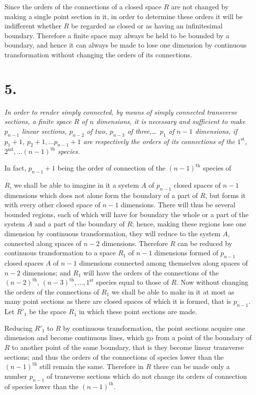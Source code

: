 \documentclass{article}
\begin{document}
Since the orders of the connections of a closed space $R$ are not changed by making a single point section in it, in order to determine these orders it will be indifferent whether $R$ be regarded as closed or as having an infinitesimal boundary. Therefore a finite space may always be held to be bounded by a boundary, and hence it can always be made to lose one dimension by continuous transformation without changing the orders of its connections.

\section*{5.}

\emph{In order to render simply connected, by means of simply connected transverse sections, a finite space $R$ of $n$ dimensions, it is necessary and sufficient to make $p_{n-1}$ linear sections, $p_{n-2}$ of two, $p_{n-3}$ of three,\ldots\ $p_{1}$ of $n-1$ dimensions, if $p_{1}+1$, $p_{2}+1,\ldots p_{n-1}+1$ are respectively the orders of its connections of the $1^{\text{st}}$, $2^{\text{nd}},\ldots (n-1)^{\text{th}}$ species.}

In fact, $p_{n-1}+1$ being the order of connection of the $(n-1)^{\text{th}}$ species of

$R$, we shall be able to imagine in it a system $A$ of $p_{n-1}$ closed spaces of $n-1$ dimensions which does not alone form the boundary of a part of $R$, but forms it with every other closed space of $n-1$ dimensions. There will thus be several bounded regions, each of which will have for boundary the whole or a part of the system $A$ and a part of the boundary of $R$; hence, making these regions lose one dimension by continuous transformation, they will reduce to the system $A$, connected along spaces of $n-2$ dimensions. Therefore $R$ can be reduced by continuous transformation to a space $R_{1}$ of $n-1$ dimensions formed of $p_{n-1}$ closed spaces $A$ of $n-1$ dimensions connected among themselves along spaces of $n-2$ dimensions; and $R_{1}$ will have the orders of the connections of the $(n-2)^{\text{th}}$, $(n-3)^{\text{th}},\ldots, 1^{\text{st}}$ species equal to those of $R$. Now without changing the orders of the connections of $R_{1}$ we shall be able to make in it at most as many point sections as there are closed spaces of which it is formed, that is $p_{n-1}$. Let $R'_{1}$ be the space $R_{1}$ in which these point sections are made.

Reducing $R'_{1}$ to $R$ by continuous transformation, the point sections acquire one dimension and become continuous lines, which go from a point of the boundary of $R$ to another point of the same boundary, that is they become linear transverse sections; and thus the orders of the connections of species lower than the $(n-1)^{\text{th}}$ still remain the same. Therefore in $R$ there can be made only a number $p_{n-1}$ of transverse sections which do not change its orders of connection of species lower than the $(n-1)^{\text{th}}$.
\end{document}
